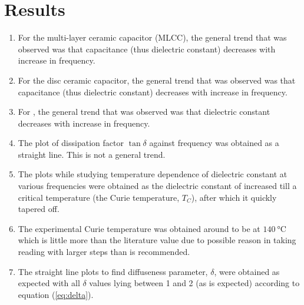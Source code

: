 \documentclass[%
 aip,
 amsmath,amssymb,
 reprint, floatfix%
]{revtex4-1}
\begin{document}
    
    
\section{Results}
\begin{enumerate}
    \item For the multi-layer ceramic capacitor (MLCC), the general trend that was observed was that capacitance (thus dielectric constant) decreases with increase in frequency.
    \item For the disc ceramic capacitor, the general trend that was observed was that capacitance (thus dielectric constant) decreases with increase in frequency.
    \item For , the general trend that was observed was that dielectric constant decreases with increase in frequency.
    \item The plot of dissipation factor $\tan \delta$ against frequency was obtained as a straight line. This is not a general trend.
    \item The plots while studying temperature dependence of dielectric constant at various frequencies were obtained as the dielectric constant of  increased till a critical temperature (the Curie temperature, $T_C$), after which it quickly tapered off.
    \item The experimental Curie temperature was obtained around to be at $\SI{140}{\celsius}$ which is little more than the literature value due to possible reason in taking reading with larger steps than is recommended.
    \item The straight line plots to find diffuseness parameter, $\delta$, were obtained as expected with all $\delta$ values lying between 1 and 2 (as is expected) according to equation (\ref{eq:delta}).
\end{enumerate}
\end{document}
